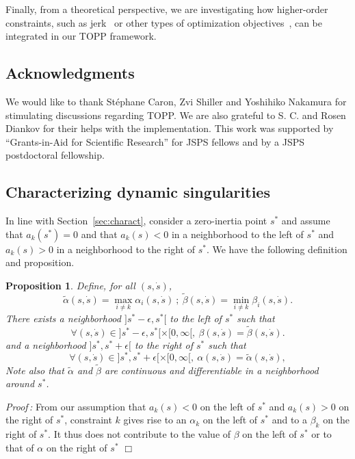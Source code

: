 \documentclass[9pt,technote]{IEEEtran}
\newtheorem{Prop}{Proposition}
\begin{document}
Finally, from a theoretical perspective, we are investigating how
higher-order constraints, such as jerk~\cite{TS93icra,CC00jrs} or
other types of optimization objectives~\cite{VerX09tac,DebX13tr}, can be
integrated in our TOPP framework.


\subsection*{Acknowledgments} We would like to thank St\'ephane Caron,
Zvi Shiller and Yoshihiko Nakamura for stimulating discussions
regarding TOPP. We are also grateful to S. C. and Rosen Diankov for
their helps with the implementation. This work was supported by
``Grants-in-Aid for Scientific Research'' for JSPS fellows and by a
JSPS postdoctoral fellowship.


\appendix

\subsection{Characterizing dynamic singularities}

In line with Section~\ref{sec:charact}, consider a zero-inertia point
$s^*$ and assume that $a_k(s^*)=0$ and that $a_k(s)<0$ in a
neighborhood to the left of $s^*$ and $a_k(s)>0$ in a neighborhood to
the right of $s^*$. We have the following definition and proposition.

\begin{Prop}
  \label{prop:alphabeta}
  Define, for all $(s,\dot s)$,
  \[
  \tilde{\alpha}(s,\dot s) = \max_{i\neq k} \alpha_i(s,\dot s) \ ;\ 
  \tilde{\beta}(s,\dot s) = \min_{i\neq k} \beta_i(s,\dot s).
  \]
  There exists a neighborhood $]s^*-\epsilon,s^*[$ to the \emph{left}
  of $s^*$ such that
  \[
  \forall (s,\dot s) \in ]s^*-\epsilon,s^*[\times
  [0,\infty[,\ \beta(s,\dot s) = \tilde{\beta}(s,\dot s).
  \]   
  and a neighborhood $]s^*,s^*+\epsilon[$ to the
  \emph{right} of $s^*$ such that
  \[
  \forall (s,\dot s) \in ]s^*,s^*+\epsilon[\times
  [0,\infty[,\ \alpha(s,\dot s) = \tilde{\alpha}(s,\dot s),
  \]
  Note also that $\tilde{\alpha}$ and $\tilde{\beta}$ are continuous
  and differentiable in a neighborhood \emph{around} $s^*$.
\end{Prop}

\emph{Proof\,:} From our assumption that $a_k(s)<0$ on the left of
$s^*$ and $a_k(s)>0$ on the right of $s^*$, constraint $k$ gives rise
to an $\alpha_k$ on the left of $s^*$ and to a $\beta_k$ on the right
of $s^*$. It thus does not contribute to the value of $\beta$ on the
left of $s^*$ or to that of $\alpha$ on the right of $s^*$ $\Box$
\end{document}
